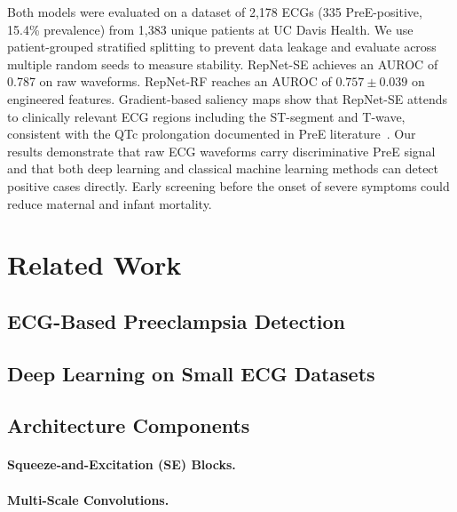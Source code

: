 \documentclass[sigconf,nonacm]{acmart}
\begin{document}
Both models were evaluated on a dataset of 2,178 ECGs (335 PreE-positive, 15.4\% prevalence) from 1,383 unique patients at UC Davis Health. We use patient-grouped stratified splitting to prevent data leakage and evaluate across multiple random seeds to measure stability. RepNet-SE achieves an AUROC of 0.787 on raw waveforms. RepNet-RF reaches an AUROC of $0.757 \pm 0.039$ on engineered features. Gradient-based saliency maps show that RepNet-SE attends to clinically relevant ECG regions including the ST-segment and T-wave, consistent with the QTc prolongation documented in PreE literature~\cite{aboshady_qtc_2025}. Our results demonstrate that raw ECG waveforms carry discriminative PreE signal and that both deep learning and classical machine learning methods can detect positive cases directly. Early screening before the onset of severe symptoms could reduce maternal and infant mortality.

\section{Related Work}
\label{sec:related}

\subsection{ECG-Based Preeclampsia Detection}

\subsection{Deep Learning on Small ECG Datasets}

\subsection{Architecture Components}

\paragraph{Squeeze-and-Excitation (SE) Blocks.}

\paragraph{Multi-Scale Convolutions.}
\end{document}
